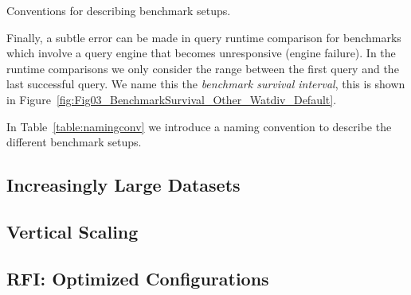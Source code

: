 \begin{table}[ht!]
	\centering
	\caption{Conventions for describing benchmark setups.}
	\label{table:namingconv}
	 \caption*{A description consists of a 3-character prefix describing the RDF storage solution, the number of nodes, the amount of memory and the configuration.}
\end{table}

Finally, a subtle error can be made in query runtime comparison for benchmarks which involve a query engine that becomes unresponsive (engine failure). In the runtime comparisons we only consider the range between the first query and the last successful query. We name this the \emph{benchmark survival interval}, this is shown in Figure~\ref{fig:Fig03_BenchmarkSurvival_Other_Watdiv_Default}.

In Table~\ref{table:namingconv} we introduce a naming convention to describe the different benchmark setups. 

\subsection{Increasingly Large Datasets}
\label{subsec:bigdata}


\subsection{Vertical Scaling}
\label{subsec:vscaling}


\subsection{RFI: Optimized Configurations}
\label{subsec:rfi}


